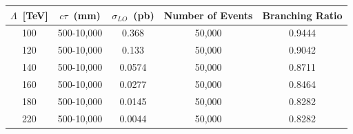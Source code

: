 \vspace{5mm}
\begin{minipage}{0.94\textwidth} 
\begin{center}
\centering
\begin{tabular}{c c c c c}
       \toprule
        \hline
        $\Lambda$~[TeV] & $c\tau$~(mm) & $\sigma_{LO}$~(pb) & \bfseries{Number of Events} & \bfseries{Branching Ratio}\\
       \hline
       \toprule
       100 & 500-10,000  & 0.368  & 50,000 & 0.9444\\
       120 & 500-10,000  & 0.133  & 50,000 & 0.9042\\
       140 & 500-10,000  & 0.0574 & 50,000 & 0.8711\\
       160 & 500-10,000  & 0.0277 & 50,000 & 0.8464\\
       180 & 500-10,000  & 0.0145 & 50,000 & 0.8282\\
       220 & 500-10,000  & 0.0044 & 50,000 & 0.8282\\
       \hline
       \bottomrule
       \end{tabular}  
\label{tab:mc_GMSB_sample}
\end{center}
\end{minipage}

